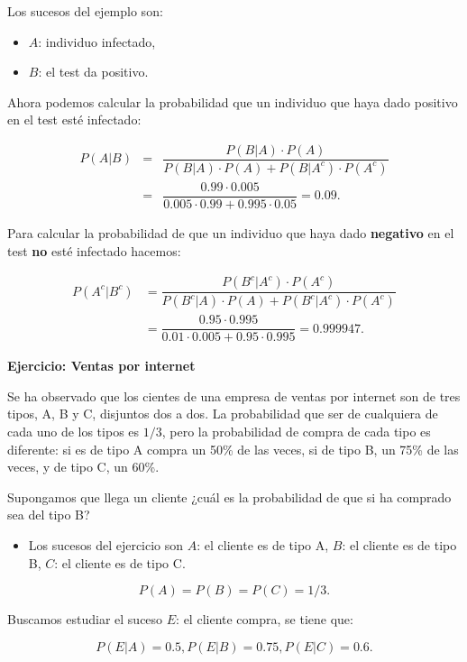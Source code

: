 \documentclass[]{book}
\providecommand{\tightlist}{%
  \setlength{\itemsep}{0pt}\setlength{\parskip}{0pt}}
\begin{document}
Los sucesos del ejemplo son:

\begin{itemize}
\tightlist
\item
  \(A\): individuo infectado,
\item
  \(B\): el test da positivo.
\end{itemize}

Ahora podemos calcular la probabilidad que un individuo que haya dado positivo en el test esté infectado:

\begin{eqnarray*}
P(A|B) & =& \dfrac{P(B|A)\cdot P(A)}{P(B|A)\cdot P(A)+P(B|A^c)\cdot P(A^c)}\\
&=&\dfrac{0.99\cdot 0.005}{0.005\cdot 0.99+0.995\cdot 0.05}=0.09.
\end{eqnarray*}

Para calcular la probabilidad de que un individuo que haya dado \textbf{negativo} en el test \textbf{no} esté infectado hacemos:

\[
\begin{array}{rl} P(A^c|B^c)& =\dfrac{P(B^c|A^c)\cdot P(A^c)}{P(B^c|A)\cdot P(A)+P(B^c|A^c)\cdot P(A^c)}\\ & =\dfrac{0.95\cdot 0.995}{0.01\cdot 0.005+0.95\cdot 0.995}=0.999947.\end{array}
\]

\textbf{Ejercicio: Ventas por internet}

Se ha observado que los cientes de una empresa de ventas por internet son de tres tipos, A, B y C, disjuntos dos a dos. La probabilidad que ser de cualquiera de cada uno de los tipos es \(1/3\), pero la probabilidad de compra de cada tipo es diferente: si es de tipo A compra un 50\% de las veces, si de tipo B, un 75\% de las veces, y de tipo C, un 60\%.

Supongamos que llega un cliente ¿cuál es la probabilidad de que si ha comprado sea del tipo B?

\begin{itemize}
\tightlist
\item
  Los sucesos del ejercicio son \(A\): el cliente es de tipo A, \(B\): el cliente es de tipo B, \(C\): el cliente es de tipo C.
\end{itemize}

\[P(A)=P(B)=P(C)=1/3.\]

Buscamos estudiar el suceso \(E\): el cliente compra, se tiene que:

\[P(E|A)=0.5, P(E|B)=0.75, P(E|C)=0.6.\]
\end{document}
